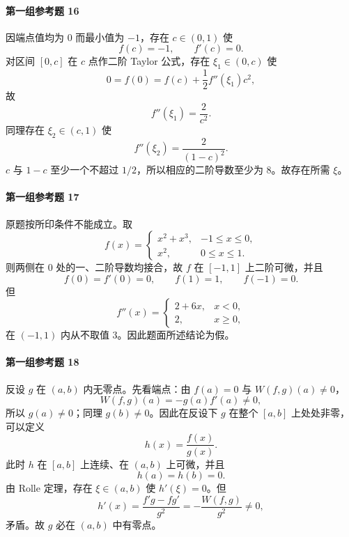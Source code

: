 \paragraph{第一组参考题 16}
\begin{xsolution}
因端点值均为 0 而最小值为 $-1$，存在 $c\in(0,1)$ 使
\[
  f(c)=-1,\qquad f'(c)=0.
\]
对区间 $[0,c]$ 在 $c$ 点作二阶 Taylor 公式，存在 $\xi_1\in(0,c)$ 使
\[
  0=f(0)=f(c)+\frac12f''(\xi_1)c^2,
\]
故
\[
  f''(\xi_1)=\frac2{c^2}.
\]
同理存在 $\xi_2\in(c,1)$ 使
\[
  f''(\xi_2)=\frac2{(1-c)^2}.
\]
$c$ 与 $1-c$ 至少一个不超过 $1/2$，所以相应的二阶导数至少为 8。故存在所需 $\xi$。
\end{xsolution}

\paragraph{第一组参考题 17}
\begin{xsolution}
原题按所印条件不能成立。取
\[
  f(x)=
  \begin{cases}
    x^2+x^3,&-1\le x\le0,\\
    x^2,&0\le x\le1.
  \end{cases}
\]
则两侧在 $0$ 处的一、二阶导数均接合，故 $f$ 在 $[-1,1]$ 上二阶可微，并且
\[
  f(0)=f'(0)=0,\qquad f(1)=1,\qquad f(-1)=0.
\]
但
\[
  f''(x)=
  \begin{cases}
    2+6x,&x<0,\\
    2,&x\ge0,
  \end{cases}
\]
在 $(-1,1)$ 内从不取值 3。因此题面所述结论为假。
\end{xsolution}

\paragraph{第一组参考题 18}
\begin{xsolution}
反设 $g$ 在 $(a,b)$ 内无零点。先看端点：由 $f(a)=0$ 与 $W(f,g)(a)\ne0$，
\[
  W(f,g)(a)=-g(a)f'(a)\ne0,
\]
所以 $g(a)\ne0$；同理 $g(b)\ne0$。因此在反设下 $g$ 在整个 $[a,b]$ 上处处非零，可以定义
\[
  h(x)=\frac{f(x)}{g(x)}.
\]
此时 $h$ 在 $[a,b]$ 上连续、在 $(a,b)$ 上可微，并且
\[
  h(a)=h(b)=0.
\]
由 Rolle 定理，存在 $\xi\in(a,b)$ 使 $h'(\xi)=0$。但
\[
  h'(x)=\frac{f'g-fg'}{g^2}
  =-\frac{W(f,g)}{g^2}\ne0,
\]
矛盾。故 $g$ 必在 $(a,b)$ 中有零点。
\end{xsolution}

